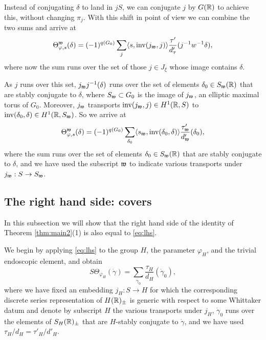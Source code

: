 \documentclass{article}
\theoremstyle{definition}
\numberwithin{equation}{section}
\renewcommand{\-}{\hyp{}}
\begin{document}
Instead of conjugating $\delta$ to land in $jS$, we can conjugate $j$ by $G(\mathbb{R})$ to achieve this, without changing $\pi_j$. With this shift in point of view we can combine the two sums and arrive at
\[ \Theta^{\mathfrak{w}}_{\varphi,s}(\delta) = (-1)^{q(G_0)} \sum_j \langle s,\textrm{inv}(j_{\mathfrak{w}},j)\rangle \frac{\tau'}{d_\tau'}(j^{-1}w^{-1}\delta), \]
where now the sum runs over the set of those $j \in J_\xi$ whose image contains $\delta$.

As $j$ runs over this set, $j_{\mathfrak{w}}j^{-1}(\delta)$ runs over the set of elements $\delta_0 \in S_{\mathfrak{w}}(\mathbb{R})$ that are stably conjugate to $\delta$, where $S_{\mathfrak{w}} \subset G_0$ is the image of $j_{\mathfrak{w}}$, an elliptic maximal torus of $G_0$. Moreover, $j_{\mathfrak{w}}$ transports $\textrm{inv}(j_{\mathfrak{w}},j) \in H^1(\mathbb{R},S)$ to $\textrm{inv}(\delta_0,\delta) \in H^1(\mathbb{R},S_{\mathfrak{w}})$. So we arrive at
\begin{equation} \label{eq:lhs}
\Theta^{\mathfrak{w}}_{\varphi,s}(\delta) = (-1)^{q(G_0)} \sum_{\delta_0} \langle s_{\mathfrak{w}},\textrm{inv}(\delta_0,\delta)\rangle \frac{\tau_{\mathfrak{w}}'}{d_{\mathfrak{w}}'}(\delta_0),
\end{equation}
where the sum runs over the set of elements $\delta_0 \in S_{\mathfrak{w}}(\mathbb{R})$ that are stably conjugate to $\delta$, and we have used the subscript $\mathfrak{w}$ to indicate various transports under $j_{\mathfrak{w}} : S \to S_{\mathfrak{w}}$.


\subsection{The right hand side: covers} \label{sub:rhs_cover}

In this subsection we will show that the right hand side of the identity of Theorem \ref{thm:main2}(1) is also equal to \eqref{eq:lhs}.

We begin by applying \eqref{eq:lhs} to the group $H$, the parameter $\varphi_H$, and the trivial endoscopic element, and obtain
\[ S\Theta_{\varphi_H}(\dot\gamma) = \sum_{\dot\gamma_0} \frac{\tau_H}{d_{H}}(\dot\gamma_0), \]
where we have fixed an embedding $j_H : S \to H$ for which the corresponding discrete series representation of $H(\mathbb{R})_\pm$ is generic with respect to some Whittaker datum and denote by subscript $H$ the various transports under $j_H$, $\dot\gamma_0$ runs over the elements of $S_H(\mathbb{R})_\pm$ that are $H$-stably conjugate to $\dot\gamma$, and we have used $\tau_H/d_H=\tau'_H/d'_H$.
\end{document}
